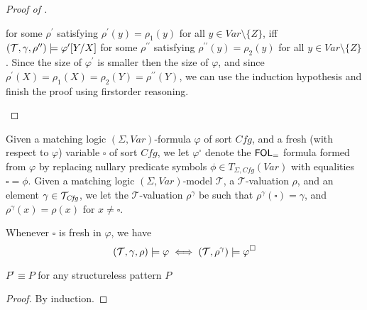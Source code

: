 \begin{proof}[Proof of ]
\begin{itemize}
\begin{itemize}
              for some $\rho^\prime$ satisfying $\rho^\prime(y) = \rho_1(y)$ for all $y \in \mathit{Var} \setminus \{ Z \}$, iff $(\mathcal{T}, \gamma, \rho^{\prime\prime}) \models \varphi^\prime[Y/X]$ for some $\rho^{\prime\prime}$ satisfying $\rho^{\prime\prime}(y) = \rho_2(y)$ for all $y \in \mathit{Var} \setminus \{ Z \}$.
              Since the size of $\varphi^\prime$ is smaller then the size of $\varphi$,
              and since $\rho^{\prime}(X) = \rho_1(X) = \rho_2(Y) = \rho^{\prime\prime}(Y)$,
              we can use the induction hypothesis and finish the proof using firstorder reasoning.
          \end{itemize}
      \end{itemize}
\end{proof}
 

\begin{definition}
    Given a matching logic $(\Sigma, \mathit{Var})$-formula $\varphi$ of sort $\mathit{Cfg}$,
    and a fresh (with respect to $\varphi$) variable $\square$ of sort $\mathit{Cfg}$,
    we let $\varphi^\square$ denote the $\mathsf{FOL}_{=}$ formula formed from $\varphi$ by replacing
    nullary predicate symbols $\phi \in T_{\Sigma, \mathit{Cfg}}(\mathit{Var})$
    with equalities $\square = \phi$.
    Given a matching logic $(\Sigma, \mathit{Var})$-model $\mathcal{T}$, a $\mathcal{T}$-valuation $\rho$,
    and an element $\gamma \in \mathcal{T}_{\mathit{Cfg}}$,
    we let the $\mathcal{T}$-valuation $\rho^\gamma$ be such that $\rho^\gamma(\square) = \gamma$,
    and $\rho^\gamma(x) = \rho(x)$ for $x \not = \square$.
\end{definition}

\begin{lemma}\label{lem:patternToFOLSemantics}
    Whenever $\square$ is fresh in $\varphi$, we have
    \begin{equation*}
        (\mathcal{T}, \gamma, \rho) \models \varphi \iff (\mathcal{T}, \rho^\gamma) \models \varphi^\square
    \end{equation*}    
\end{lemma}

\begin{lemma}\label{lem:structurelessFOLtranslation}
    $P^\square \equiv P$ for any structureless pattern $P$
\end{lemma}
\begin{proof}
    By induction.
\end{proof}

